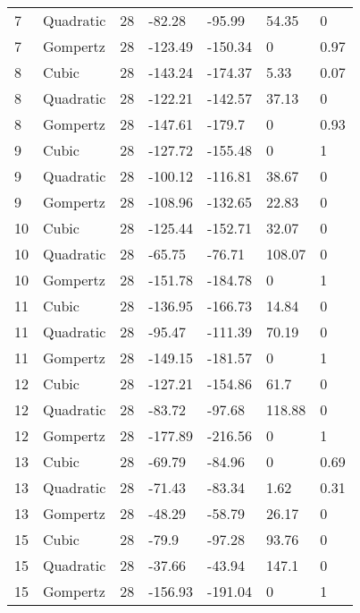 \documentclass[11pt]{article}
\begin{document}
\begin{center}
\begin{longtable}{lllllll}
    7   & Quadratic & 28              & -82.28  & -95.99  & 54.35   & 0    \\
    7   & Gompertz  & 28              & -123.49 & -150.34 & 0       & 0.97 \\
    8   & Cubic     & 28              & -143.24 & -174.37 & 5.33    & 0.07 \\
    8   & Quadratic & 28              & -122.21 & -142.57 & 37.13   & 0    \\
    8   & Gompertz  & 28              & -147.61 & -179.7  & 0       & 0.93 \\
    9   & Cubic     & 28              & -127.72 & -155.48 & 0       & 1    \\
    9   & Quadratic & 28              & -100.12 & -116.81 & 38.67   & 0    \\
    9   & Gompertz  & 28              & -108.96 & -132.65 & 22.83   & 0    \\
    10  & Cubic     & 28              & -125.44 & -152.71 & 32.07   & 0    \\
    10  & Quadratic & 28              & -65.75  & -76.71  & 108.07  & 0    \\
    10  & Gompertz  & 28              & -151.78 & -184.78 & 0       & 1    \\
    11  & Cubic     & 28              & -136.95 & -166.73 & 14.84   & 0    \\
    11  & Quadratic & 28              & -95.47  & -111.39 & 70.19   & 0    \\
    11  & Gompertz  & 28              & -149.15 & -181.57 & 0       & 1    \\
    12  & Cubic     & 28              & -127.21 & -154.86 & 61.7    & 0    \\
    12  & Quadratic & 28              & -83.72  & -97.68  & 118.88  & 0    \\
    12  & Gompertz  & 28              & -177.89 & -216.56 & 0       & 1    \\
    13  & Cubic     & 28              & -69.79  & -84.96  & 0       & 0.69 \\
    13  & Quadratic & 28              & -71.43  & -83.34  & 1.62    & 0.31 \\
    13  & Gompertz  & 28              & -48.29  & -58.79  & 26.17   & 0    \\
    15  & Cubic     & 28              & -79.9   & -97.28  & 93.76   & 0    \\
    15  & Quadratic & 28              & -37.66  & -43.94  & 147.1   & 0    \\
    15  & Gompertz  & 28              & -156.93 & -191.04 & 0       & 1    \\

\end{longtable}
\end{center}
\end{document}
